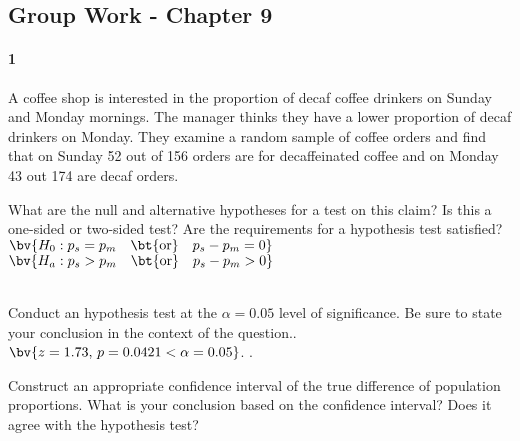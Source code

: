 \documentclass{article}
\begin{document}
\begin{flushleft}
\section*{Group Work - Chapter 9}
\paragraph{1} A coffee shop is interested in the proportion of decaf coffee drinkers on Sunday and Monday mornings. The manager thinks they have a lower proportion of decaf drinkers on Monday. They examine a random sample of coffee orders and find that on Sunday 52 out of 156 orders are for decaffeinated coffee and on Monday 43 out 174 are decaf orders.
\begin{enumalpha}
\item What are the null and alternative hypotheses for a test on this claim? Is this a one-sided or two-sided test? Are the requirements for a hypothesis test satisfied?\\
\medskip
$\bv{H_0: p_s = p_m \quad \text{\bt{or}} \quad p_s - p_m = 0}$ \\
$\bv{H_a: p_s > p_m \quad \text{\bt{or}} \quad p_s - p_m > 0}$ \\
\\
\vspace{.5in}
\item Conduct an hypothesis test at the $\alpha = 0.05$ level of significance. Be sure to state your conclusion in the context of the question..\\
\medskip
$\bv{z = 1.73, \, p = 0.0421 < \alpha = 0.05}$. .\\
\vspace{.5in}
\item Construct an appropriate confidence interval of the true difference of population proportions. What is your conclusion based on the confidence interval? Does it agree with the hypothesis test?\\
\medskip
{}\\
\end{enumalpha}




\end{flushleft}
\end{document}
